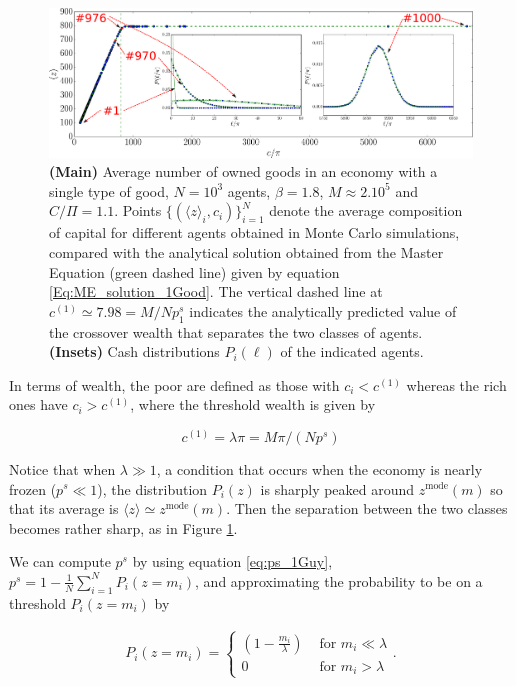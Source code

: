 \begin{figure}%
\centering
\includegraphics[width=\textwidth]{figs_ineq/fig3_ownership_average_beta=1p80_e=1p10-byHand.pdf}
\caption{\textbf{(Main)} Average number of owned goods in an economy with a single type of good, $N=10^3$ agents, $\beta=1.8$, $M\approx 2 . 10^5$ and $C/\Pi=1.1$. Points $\{(\langle z \rangle_i,c_i)\}_{i=1}^{N}$ denote the average composition of capital for different agents obtained in Monte Carlo simulations, compared with the analytical solution obtained from the Master Equation (green dashed line) given by equation \eqref{Eq:ME_solution_1Good}.
The vertical dashed line at $c^{(1)}\simeq 7.98=M/N p^s_1$ indicates the analytically predicted value of the crossover wealth that separates the two classes of agents. \textbf{(Insets)} Cash distributions $P_i(\ell)$ of the indicated agents. 
}
\label{Fig:Picturesque_RichPoor_transition_beta}
\end{figure}

In terms of wealth, the poor are defined as those with $c_i<c^{(1)}$ whereas the rich ones have $c_i>c^{(1)}$, where the threshold wealth is given by 

\begin{equation}
c^{(1)} = \lambda \pi = M \pi/(N p^s)
\label{eq:c1}
\end{equation}

Notice that when $\lambda\gg 1$, a condition that occurs when the economy is nearly frozen ($p^s\ll 1$), the distribution $P_i(z)$ is sharply peaked around $z^{\text{mode}}(m)$ so that its average is $\langle z\rangle\simeq z^{\text{mode}}(m)$. Then the separation between the two classes becomes rather sharp, as in Figure \ref{Fig:Picturesque_RichPoor_transition_beta}.

We can compute $p^s$ by using equation \eqref{eq:ps_1Guy}, $p^s = 1 - \frac{1}{N} \sum_{i=1}^{N} P_i(z = m_i)$, and approximating the probability to be on a threshold $P_i(z=m_i)$ by

\begin{align}
P_i(z=m_i) = 
\begin{cases}
\left( 1 - \frac{m_i}{\lambda} \right) & \text{ for } m_i \ll \lambda \\
0 & \text{ for } m_i > \lambda
\end{cases}.
\end{align}

